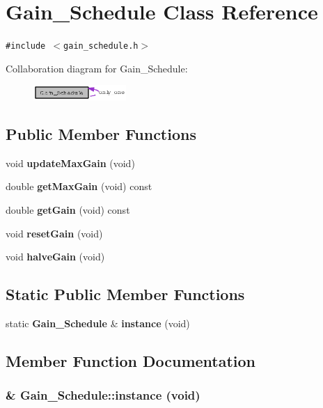 \section{Gain\_\-Schedule Class Reference}
\label{classGain__Schedule}
{\tt \#include $<$gain\_\-schedule.h$>$}

Collaboration diagram for Gain\_\-Schedule:\begin{figure}[H]
\begin{center}
\leavevmode
\includegraphics[width=100pt]{classGain__Schedule__coll__graph}
\end{center}
\end{figure}
\subsection*{Public Member Functions}
\begin{CompactItemize}
\item 
void {\bf update\-Max\-Gain} (void)
\item 
double {\bf get\-Max\-Gain} (void) const
\item 
double {\bf get\-Gain} (void) const
\item 
void {\bf reset\-Gain} (void)
\item 
void {\bf halve\-Gain} (void)
\end{CompactItemize}
\subsection*{Static Public Member Functions}
\begin{CompactItemize}
\item 
static {\bf Gain\_\-Schedule} \& {\bf instance} (void)
\end{CompactItemize}


\subsection{Member Function Documentation}
\subsubsection{ \& Gain\_\-Schedule::instance (void)\hspace{0.3cm}{\tt  [static]}}\label{classGain__Schedule_e9eeedf767171cf65a3fa1ce7728a48d}


